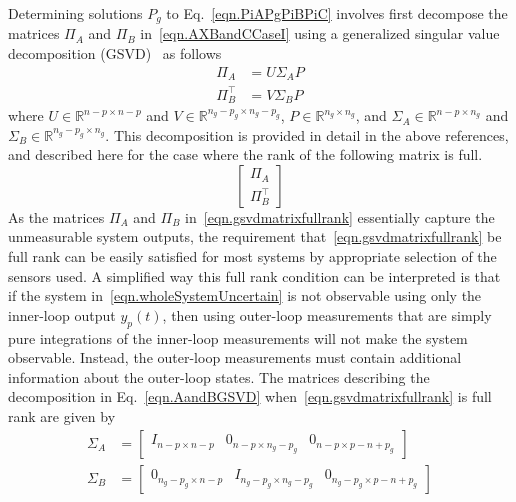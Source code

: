 Determining solutions $P_{g}$ to Eq.\ \eqref{eqn.PiAPgPiBPiC} involves first decompose the matrices $\Pi_{A}$ and $\Pi_{B}$ in\ \eqref{eqn.AXBandCCaseI} using a generalized singular value decomposition (GSVD)\ \cite{golub.matrix.1996,dai.symmetric.1996,paige.towardsgsvd.1981,hua.symmetric.1990} as follows
\begin{equation}
  \label{eqn.AandBGSVD}
  \begin{split}
    \Pi_{A} &= U\Sigma_{A}P \\
    \Pi_{B}^{\top} &= V\Sigma_{B}P
  \end{split}
\end{equation}
where $U\in\mathbb{R}^{n-p\times n-p}$ and $V\in\mathbb{R}^{n_{g}-p_{g}\times n_{g}-p_{g}}$, $P\in\mathbb{R}^{n_{g}\times n_{g}}$, and $\Sigma_{A}\in\mathbb{R}^{n-p\times n_{g}}$ and $\Sigma_{B}\in\mathbb{R}^{n_{g}-p_{g}\times n_{g}}$.
This decomposition is provided in detail in the above references, and described here for the case where the rank of the following matrix is full.
\begin{equation}
  \label{eqn.gsvdmatrixfullrank}
  \begin{bmatrix}
    \Pi_{A} \\
    \Pi_{B}^{\top}
  \end{bmatrix}
\end{equation}
As the matrices $\Pi_{A}$ and $\Pi_{B}$ in\ \eqref{eqn.gsvdmatrixfullrank} essentially capture the unmeasurable system outputs, the requirement that\ \eqref{eqn.gsvdmatrixfullrank} be full rank can be easily satisfied for most systems by appropriate selection of the sensors used.
A simplified way this full rank condition can be interpreted is that if the system in\ \eqref{eqn.wholeSystemUncertain} is not observable using only the inner-loop output $y_{p}(t)$, then using outer-loop measurements that are simply pure integrations of the inner-loop measurements will not make the system observable.
Instead, the outer-loop measurements must contain additional information about the outer-loop states.
The matrices describing the decomposition in Eq.\ \eqref{eqn.AandBGSVD} when\ \eqref{eqn.gsvdmatrixfullrank} is full rank are given by
\begin{equation}
  \label{eqn.SigmaASigmaB}
  \begin{split}
    \Sigma_{A}
    &=
    \begin{bmatrix}
      I_{n-p\times n-p} & 0_{n-p\times n_{g}-p_{g}} & 0_{n-p\times p-n+p_{g}}
    \end{bmatrix} \\
    \Sigma_{B}
    &=
    \begin{bmatrix}
      0_{n_{g}-p_{g}\times n-p} & I_{n_{g}-p_{g}\times n_{g}-p_{g}} & 0_{n_{g}-p_{g}\times p-n+p_{g}}
    \end{bmatrix} \\
  \end{split}
\end{equation}
